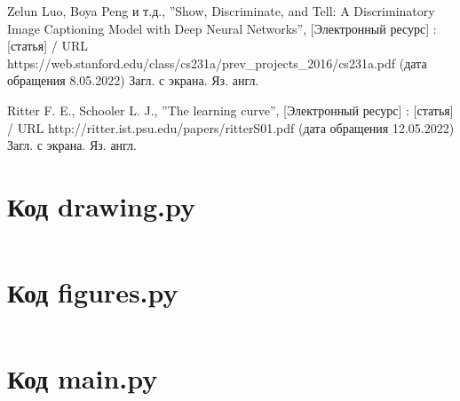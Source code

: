 \documentclass[bachelor, och, coursework]{SCWorks}
\begin{document}
\begin{thebibliography}{99}







     Zelun Luo, Boya Peng и т.д., ''Show, Discriminate,
    and Tell: A Discriminatory Image Captioning Model with Deep Neural
    Networks'', [Электронный ресурс] : [статья] / URL
    https://web.stanford.edu/class/cs231a/prev_projects_2016/cs231a.pdf (дата
    обращения 8.05.2022) Загл. с экрана. Яз. англ.

    
     Ritter F. E., Schooler L. J., ''The learning curve'',
    [Электронный ресурс] : [статья] / URL
    http://ritter.ist.psu.edu/papers/ritterS01.pdf (дата обращения 12.05.2022)
    Загл. с экрана. Яз. англ.


\end{thebibliography}

\appendix

    \section{Код drawing.py}
    \inputminted[fontsize=\footnotesize]{text}{code/drawing.py}

    \section{Код figures.py}
    \inputminted[fontsize=\footnotesize]{text}{code/figures.py}

    \section{Код main.py}
    \inputminted[fontsize=\footnotesize]{text}{code/main.py}
\end{document}
